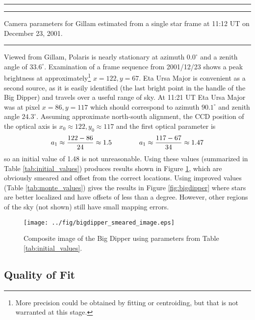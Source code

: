 \documentclass[11pt,twoside]{article}   %
\begin{document}
 \begin{table}[htb!]
   \begin{center}
   \hrule
   \footnotesize
   
   \normalsize
   \hrule \vspace*{-3ex}
   \end{center}
     \caption[Initial values]
   {Camera parameters for Gillam estimated from a single star frame at 11:12 UT
   on December 23, 2001.
     \label{tab:initial_values}  }
   \hrule
 \end{table}

Viewed from Gillam,  Polaris is nearly stationary at azimuth
$0.0^\circ$ and a zenith angle of $33.6^\circ$.  Examination of a
frame sequence from 2001/12/23 shows a peak brightness at
approximately\footnote{More precision could be obtained by fitting
or centroiding, but that is not warranted at this stage.} $x=122,
y=67$.  Eta Ursa Major is convenient as a second source, as it is
easily identified (the last bright point in the handle of the Big
Dipper) and travels over a useful range of sky.  At 11:21 UT Eta
Ursa Major was at pixel $x=86, y=117$ which should correspond to
azimuth $90.1^\circ$ and zenith angle $24.3^\circ$. Assuming
approximate north-south alignment, the CCD position of the optical
axis is $x_0\approx 122, y_0\approx 117$ and the first optical
parameter is
 \begin{equation}
  a_1 \approx {{122-86}\over 24} \approx 1.5 \qquad\qquad
  a_1\approx {{117-67}\over 34} \approx 1.47
 \end{equation}
so an initial value of 1.48 is not unreasonable.  Using these
values (summarized in Table \ref{tab:initial_values}) produces
results shown in Figure \ref{fig:bigdipper_smeared}, which are
obviously smeared and offset from the correct locations.  Using
improved values (Table \ref{tab:monte_values}) gives the results
in Figure \ref{fig:bigdipper} where stars are better localized and
have offsets of less than a degree.  However, other regions of the
sky (not shown) still have small mapping errors.

\begin{figure}[htb!]
  \texttt{[image: ../fig/bigdipper\_smeared\_image.eps]}
    \caption[Poor quality composite image of the Big Dipper]
   {Composite image of the Big Dipper using parameters from Table
   \ref{tab:initial_values}.
     \label{fig:bigdipper_smeared}  }
\end{figure}

 \subsection{Quality of Fit}
\end{document}
